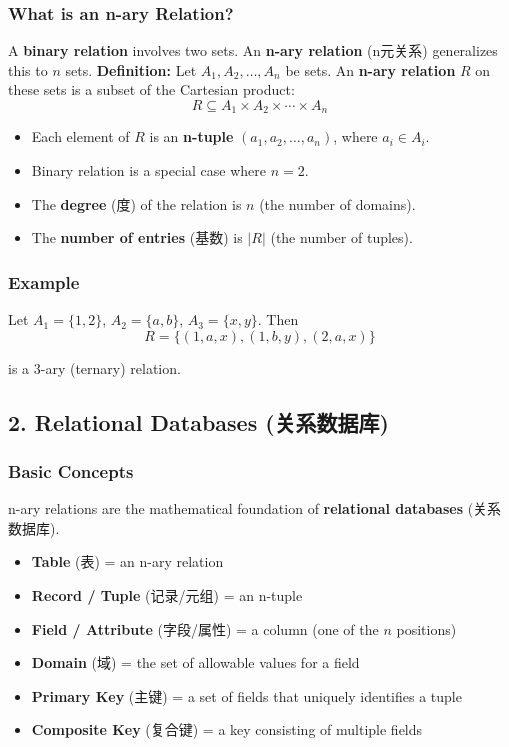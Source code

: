 \documentclass[10pt,a4paper,openany]{ctexbook}
\theoremstyle{definition}
\theoremstyle{remark}
\begin{document}
\subsubsection{What is an n-ary Relation?}

A \textbf{binary relation} involves two sets. An \textbf{n-ary relation} (n元关系) generalizes this to $n$ sets.
\textbf{Definition:} Let $A_1, A_2, \dots, A_n$ be sets. An \textbf{n-ary relation} $R$ on these sets is a subset of the Cartesian product:
\[
R \subseteq A_1 \times A_2 \times \cdots \times A_n
\]

\begin{itemize}
\item Each element of $R$ is an \textbf{n-tuple} $(a_1, a_2, \dots, a_n)$, where $a_i \in A_i$.
\item Binary relation is a special case where $n = 2$.
\item The \textbf{degree} (度) of the relation is $n$ (the number of domains).
\item The \textbf{number of entries} (基数) is $|R|$ (the number of tuples).

\end{itemize}

\subsubsection{Example}

Let $A_1 = \{1, 2\}$, $A_2 = \{a, b\}$, $A_3 = \{x, y\}$. Then
\[
R = \{(1, a, x), (1, b, y), (2, a, x)\}
\]

is a 3-ary (ternary) relation.
\vspace{-2pt}

\subsection{2. Relational Databases (关系数据库)}

\subsubsection{Basic Concepts}

n-ary relations are the mathematical foundation of \textbf{relational databases} (关系数据库).
\begin{itemize}
\item \textbf{Table} (表) = an n-ary relation
\item \textbf{Record / Tuple} (记录/元组) = an n-tuple
\item \textbf{Field / Attribute} (字段/属性) = a column (one of the $n$ positions)
\item \textbf{Domain} (域) = the set of allowable values for a field
\item \textbf{Primary Key} (主键) = a set of fields that uniquely identifies a tuple
\item \textbf{Composite Key} (复合键) = a key consisting of multiple fields

\end{itemize}
\end{document}
